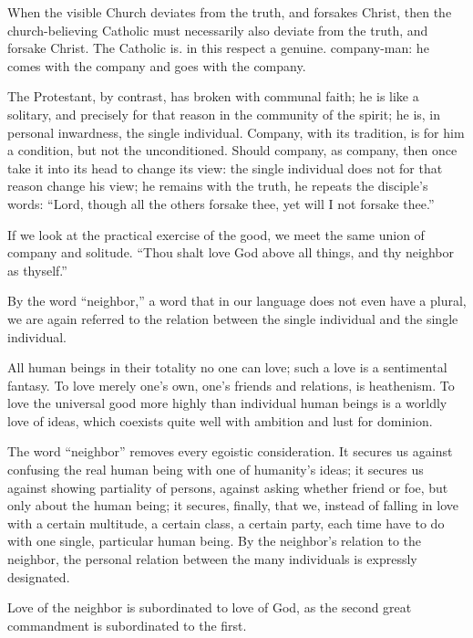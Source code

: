 \documentclass[12pt,a4paper]{book}
\begin{document}
When the visible Church deviates from the truth, and forsakes Christ, then the church-believing Catholic must necessarily also deviate from the truth, and forsake Christ. The Catholic is. in this respect a genuine. company-man: he comes with the company and goes with the company.

The Protestant, by contrast, has broken with communal faith; he is like a solitary, and precisely for that reason in the community of the spirit; he is, in personal inwardness, the single individual. Company, with its tradition, is for him a condition, but not the unconditioned. Should company, as company, then once take it into its head to change its view: the single individual does not for that reason change his view; he remains with the truth, he repeats the disciple's words: ``Lord, though all the others forsake thee, yet will I not forsake thee.''

If we look at the practical exercise of the good, we meet the same union of company and solitude. ``Thou shalt love God above all things, and thy neighbor as thyself.''

By the word ``neighbor,'' a word that in our language does not even have a plural, we are again referred to the relation between the single individual and the single individual.

All human beings in their totality no one can love; such a love is a sentimental fantasy. To love merely one's own, one's friends and relations, is heathenism. To love the universal good more highly than individual human beings is a worldly love of ideas, which coexists quite well with ambition and lust for dominion.

The word ``neighbor'' removes every egoistic consideration. It secures us against confusing the real human being with one of humanity's ideas; it secures us against showing partiality of persons, against asking whether friend or foe, but only about
the human being; it secures, finally, that we, instead of falling in love with a certain multitude, a certain class, a certain party, each time have to do with one single, particular human being. By the neighbor's relation to the neighbor, the personal relation between the many individuals is expressly designated.

Love of the neighbor is subordinated to love of God, as the second great commandment is subordinated to the first.
\end{document}
